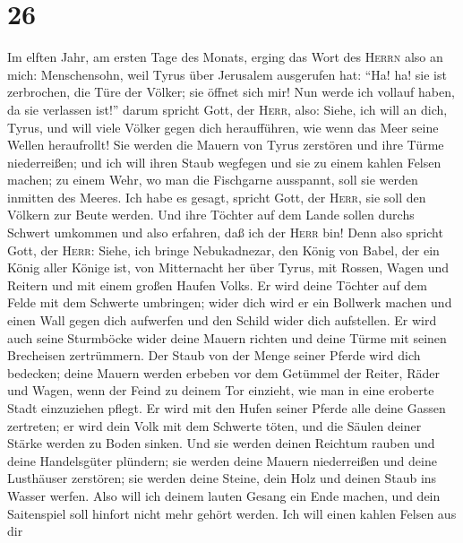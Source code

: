 \hypertarget{section-25}{%
\section{26}\label{section-25}}

 Im elften Jahr, am ersten Tage des Monats, erging das
Wort des \textsc{Herrn} also an mich:  Menschensohn, weil
Tyrus über Jerusalem ausgerufen hat: ``Ha! ha! sie ist zerbrochen, die
Türe der Völker; sie öffnet sich mir! Nun werde ich vollauf haben, da
sie verlassen ist!''  darum spricht Gott, der
\textsc{Herr}, also: Siehe, ich will an dich, Tyrus, und will viele
Völker gegen dich heraufführen, wie wenn das Meer seine Wellen
heraufrollt!  Sie werden die Mauern von Tyrus zerstören
und ihre Türme niederreißen; und ich will ihren Staub wegfegen und sie
zu einem kahlen Felsen machen;  zu einem Wehr, wo man die
Fischgarne ausspannt, soll sie werden inmitten des Meeres. Ich habe es
gesagt, spricht Gott, der \textsc{Herr}, sie soll den Völkern zur Beute
werden.  Und ihre Töchter auf dem Lande sollen durchs
Schwert umkommen und also erfahren, daß ich der \textsc{Herr} bin!
 Denn also spricht Gott, der \textsc{Herr}: Siehe, ich
bringe Nebukadnezar, den König von Babel, der ein König aller Könige
ist, von Mitternacht her über Tyrus, mit Rossen, Wagen und Reitern und
mit einem großen Haufen Volks.  Er wird deine Töchter auf
dem Felde mit dem Schwerte umbringen; wider dich wird er ein Bollwerk
machen und einen Wall gegen dich aufwerfen und den Schild wider dich
aufstellen.  Er wird auch seine Sturmböcke wider deine
Mauern richten und deine Türme mit seinen Brecheisen zertrümmern.
 Der Staub von der Menge seiner Pferde wird dich
bedecken; deine Mauern werden erbeben vor dem Getümmel der Reiter, Räder
und Wagen, wenn der Feind zu deinem Tor einzieht, wie man in eine
eroberte Stadt einzuziehen pflegt.  Er wird mit den Hufen
seiner Pferde alle deine Gassen zertreten; er wird dein Volk mit dem
Schwerte töten, und die Säulen deiner Stärke werden zu Boden sinken.
 Und sie werden deinen Reichtum rauben und deine
Handelsgüter plündern; sie werden deine Mauern niederreißen und deine
Lusthäuser zerstören; sie werden deine Steine, dein Holz und deinen
Staub ins Wasser werfen.  Also will ich deinem lauten
Gesang ein Ende machen, und dein Saitenspiel soll hinfort nicht mehr
gehört werden.  Ich will einen kahlen Felsen aus dir
